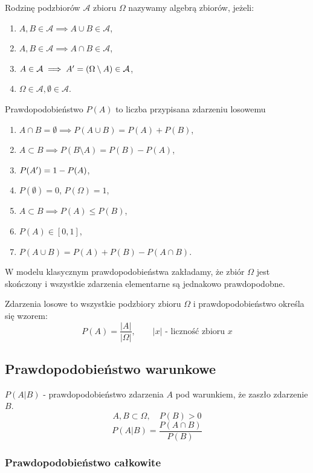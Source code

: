 \documentclass[../Matematyka.tex]{subfiles}
\begin{document}
Rodzinę podzbiorów \(\mathcal{A}\) zbioru \(\Omega\) nazywamy algebrą zbiorów, jeżeli:
\begin{enumerate}[label=(\roman*)]
    \item \(A, B \in \mathcal{A} \implies A \cup B \in \mathcal{A}\),
    \item \(A, B \in \mathcal{A} \implies A \cap B \in \mathcal{A}\),
    \item \(A \in \mathcal{A} \implies A^\prime = (\Omega \setminus A) \in \mathcal{A}\),
    \item \(\Omega \in \mathcal{A}, \emptyset \in \mathcal{A}\).
\end{enumerate}

\newpage
Prawdopodobieństwo \(P(A)\) to liczba przypisana zdarzeniu losowemu
\begin{enumerate}[label=(\roman*)]
    \item \(A \cap B = \emptyset \implies P(A \cup B) = P(A) + P(B)\),
    \item \(A \subset B \implies P(B \setminus A) = P(B) - P(A)\),
    \item \(P(A^\prime) = 1 - P(A)\),
    \item \(P(\emptyset) = 0\), \(P(\Omega) = 1\),
    \item \(A \subset B \implies P(A) \leq P(B)\),
    \item \(P(A) \in [0,1]\),
    \item \(P(A \cup B) = P(A) + P(B) - P(A \cap B)\).
\end{enumerate}

W modelu klasycznym prawdopodobieństwa zakładamy, że zbiór \(\Omega\) jest skończony i wszystkie zdarzenia elementarne są jednakowo prawdopodobne.

Zdarzenia losowe to wszystkie podzbiory zbioru \(\Omega\) i prawdopodobieństwo określa się wzorem:
\[P(A) = \frac{|A|}{|\Omega|}, \qquad |x| \text{ - liczność zbioru }x\]

\subsection{Prawdopodobieństwo warunkowe}
\(P(A|B)\) - prawdopodobieństwo zdarzenia \(A\) pod warunkiem, że zaszło zdarzenie \(B\).
\[A,B \subset \Omega, \quad P(B) > 0\]
\[P(A|B) = \frac{P(A \cap B)}{P(B)}\]

\subsubsection{Prawdopodobieństwo całkowite}
\end{document}
